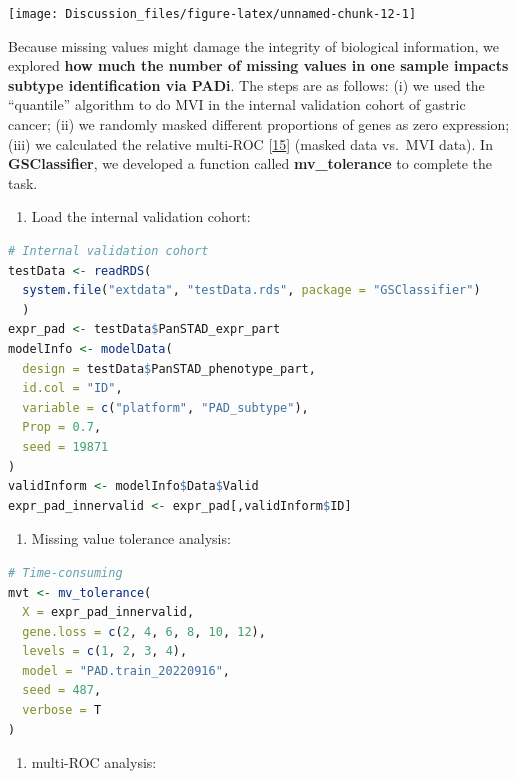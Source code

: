 \documentclass[
  12pt,
]{book}
\providecommand{\tightlist}{%
  \setlength{\itemsep}{0pt}\setlength{\parskip}{0pt}}
\begin{document}
\begin{center}\texttt{[image: Discussion\_files/figure-latex/unnamed-chunk-12-1]} \end{center}

Because missing values might damage the integrity of biological information, we explored \textbf{how much the number of missing values in one sample impacts subtype identification via PADi}. The steps are as follows: (i) we used the ``quantile'' algorithm to do MVI in the internal validation cohort of gastric cancer; (ii) we randomly masked different proportions of genes as zero expression; (iii) we calculated the relative multi-ROC {[}\protect\hyperlink{ref-pROC}{15}{]} (masked data vs.~MVI data). In \textbf{GSClassifier}, we developed a function called \textbf{mv\_tolerance} to complete the task.

\begin{enumerate}
\def\labelenumi{(\roman{enumi})}
\tightlist
\item
  Load the internal validation cohort:
\end{enumerate}

\begin{lstlisting}[language=R]
# Internal validation cohort
testData <- readRDS(
  system.file("extdata", "testData.rds", package = "GSClassifier")
  )
expr_pad <- testData$PanSTAD_expr_part
modelInfo <- modelData(
  design = testData$PanSTAD_phenotype_part,
  id.col = "ID",
  variable = c("platform", "PAD_subtype"),
  Prop = 0.7,
  seed = 19871
)
validInform <- modelInfo$Data$Valid
expr_pad_innervalid <- expr_pad[,validInform$ID]
\end{lstlisting}

\begin{enumerate}
\def\labelenumi{(\roman{enumi})}
\setcounter{enumi}{1}
\tightlist
\item
  Missing value tolerance analysis:
\end{enumerate}

\begin{lstlisting}[language=R]
# Time-consuming
mvt <- mv_tolerance(
  X = expr_pad_innervalid,
  gene.loss = c(2, 4, 6, 8, 10, 12),
  levels = c(1, 2, 3, 4),
  model = "PAD.train_20220916",
  seed = 487,
  verbose = T
)
\end{lstlisting}

\begin{enumerate}
\def\labelenumi{(\roman{enumi})}
\setcounter{enumi}{2}
\tightlist
\item
  multi-ROC analysis:
\end{enumerate}
\end{document}
